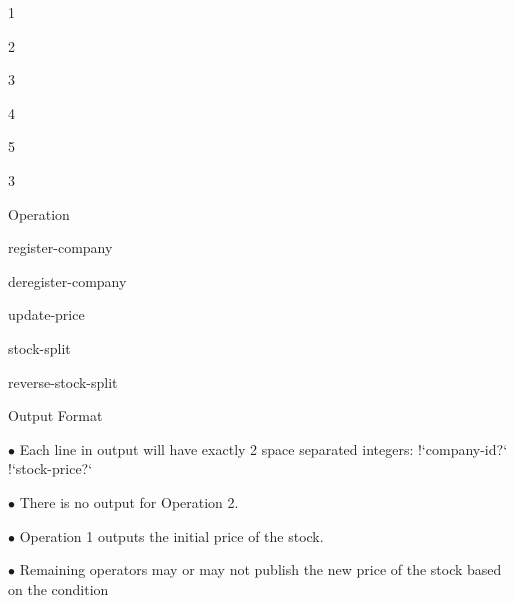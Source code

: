 \documentclass[a4paper,portrait,12pt]{article}
\begin{document}
1


2


3


4


5





3





\begin{flushleft}
Operation
\end{flushleft}


\begin{flushleft}
register-company
\end{flushleft}


\begin{flushleft}
deregister-company
\end{flushleft}


\begin{flushleft}
update-price
\end{flushleft}


\begin{flushleft}
stock-split
\end{flushleft}


\begin{flushleft}
reverse-stock-split
\end{flushleft}





\begin{flushleft}
Output Format
\end{flushleft}


\begin{flushleft}
$\bullet$ Each line in output will have exactly 2 space separated integers: !`company-id?` !`stock-price?`
\end{flushleft}


\begin{flushleft}
$\bullet$ There is no output for Operation 2.
\end{flushleft}


\begin{flushleft}
$\bullet$ Operation 1 outputs the initial price of the stock.
\end{flushleft}


\begin{flushleft}
$\bullet$ Remaining operators may or may not publish the new price of the stock based on the condition
\end{flushleft}
\end{document}
